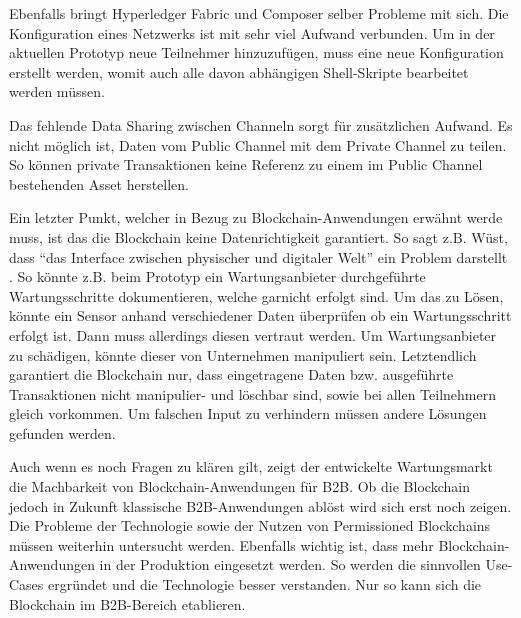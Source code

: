 Ebenfalls bringt Hyperledger Fabric und Composer selber Probleme mit sich. Die Konfiguration eines Netzwerks ist mit sehr viel Aufwand verbunden. Um in der aktuellen Prototyp neue Teilnehmer hinzuzufügen, muss eine neue Konfiguration erstellt werden, womit auch alle davon abhängigen Shell-Skripte bearbeitet werden müssen. 

Das fehlende Data Sharing zwischen Channeln sorgt für zusätzlichen Aufwand. Es nicht möglich ist, Daten vom Public Channel mit dem Private Channel zu teilen. So können private Transaktionen keine Referenz zu einem im Public Channel bestehenden Asset herstellen.

Ein letzter Punkt, welcher in Bezug zu Blockchain-Anwendungen erwähnt werde muss, ist das die Blockchain keine Datenrichtigkeit garantiert. So sagt z.B. Wüst, dass ``das Interface zwischen physischer und digitaler Welt'' ein Problem darstellt \cite{WustyouneedBlockchain2017}. So könnte z.B. beim Prototyp ein Wartungsanbieter durchgeführte Wartungsschritte dokumentieren, welche garnicht erfolgt sind. Um das zu Lösen, könnte ein Sensor anhand verschiedener Daten überprüfen ob ein Wartungsschritt erfolgt ist. Dann muss allerdings diesen vertraut werden. Um Wartungsanbieter zu schädigen, könnte dieser von Unternehmen manipuliert sein. Letztendlich garantiert die Blockchain nur, dass eingetragene Daten bzw. ausgeführte Transaktionen nicht manipulier- und löschbar sind, sowie bei allen Teilnehmern gleich vorkommen. Um falschen Input zu verhindern müssen andere Lösungen gefunden werden.

Auch wenn es noch Fragen zu klären gilt, zeigt der entwickelte Wartungsmarkt die Machbarkeit von Blockchain-Anwendungen für B2B. Ob die Blockchain jedoch in Zukunft klassische B2B-Anwendungen ablöst wird sich erst noch zeigen. Die Probleme der Technologie sowie der Nutzen von Permissioned Blockchains müssen weiterhin untersucht werden. Ebenfalls wichtig ist, dass mehr Blockchain-Anwendungen in der Produktion eingesetzt werden. So werden die sinnvollen Use-Cases ergründet und die Technologie besser verstanden. Nur so kann sich die Blockchain im B2B-Bereich etablieren.





